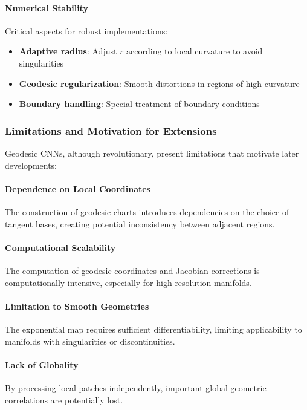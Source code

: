 \paragraph{Numerical Stability}

Critical aspects for robust implementations:
\begin{itemize}
    \item \textbf{Adaptive radius}: Adjust $r$ according to local curvature to avoid singularities
    \item \textbf{Geodesic regularization}: Smooth distortions in regions of high curvature
    \item \textbf{Boundary handling}: Special treatment of boundary conditions
\end{itemize}

\subsubsection{Limitations and Motivation for Extensions}

Geodesic CNNs, although revolutionary, present limitations that motivate later developments:

\paragraph{Dependence on Local Coordinates}
The construction of geodesic charts introduces dependencies on the choice of tangent bases, creating potential inconsistency between adjacent regions.

\paragraph{Computational Scalability}
The computation of geodesic coordinates and Jacobian corrections is computationally intensive, especially for high-resolution manifolds.

\paragraph{Limitation to Smooth Geometries}
The exponential map requires sufficient differentiability, limiting applicability to manifolds with singularities or discontinuities.

\paragraph{Lack of Globality}
By processing local patches independently, important global geometric correlations are potentially lost.

